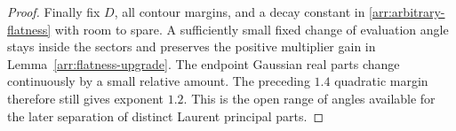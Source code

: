 \begin{proof}
Finally fix \(D\), all contour margins, and a decay
constant in \eqref{arr:arbitrary-flatness} with room to
spare.  A sufficiently small fixed change of evaluation
angle stays inside the sectors and preserves the
positive multiplier gain in
Lemma~\ref{arr:flatness-upgrade}.
The endpoint Gaussian real parts change continuously
by a small relative amount.  The preceding \(1.4\)
quadratic margin therefore still gives exponent \(1.2\).
This is the open range of angles available for the
later separation of distinct Laurent principal parts.
\end{proof}
